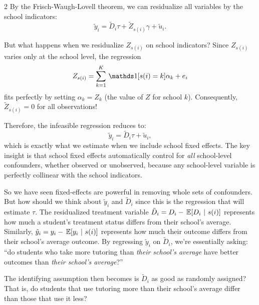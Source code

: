 \documentclass[12pt]{article}
\begin{document}
\begin{multicols}{2}
By the Frisch-Waugh-Lovell theorem, we can residualize all variables by the school indicators:
$$
  \tilde{y}_i = \tilde{D}_i \tau + \tilde{Z}_{s(i)} \gamma + \tilde{u}_i.
$$

But what happens when we residualize $Z_{s(i)}$ on school indicators? 
Since $Z_{s(i)}$ varies only at the school level, the regression
$$
  Z_{s(i)} = \sum_{k=1}^K \one{s(i)=k}\alpha_k + e_i
$$
fits perfectly by setting $\alpha_k = Z_k$ (the value of $Z$ for school $k$). Consequently, $\tilde{Z}_{s(i)} = 0$ for all observations!

Therefore, the infeasible regression reduces to:
$$
  \tilde{y}_i = \tilde{D}_i \tau + \tilde{u}_i,
$$
which is exactly what we estimate when we include school fixed effects. 
The key insight is that school fixed effects automatically control for \emph{all} school-level confounders, whether observed or unobserved, because any school-level variable is perfectly collinear with the school indicators.

So we have seen fixed-effects are powerful in removing whole sets of confounders. 
But how should we think about $\tilde{y}_i$ and $\tilde{D}_i$ since this is the regression that will estimate $\tau$.
The residualized treatment variable $\tilde{D}_i = D_i - \expec{D_i}{s(i)}$ represents how much a student's treatment status differs from their school's average. 
Similarly, $\tilde{y}_i = y_i - \expec{y_i}{s(i)}$ represents how much their outcome differs from their school's average outcome. 
By regressing $\tilde{y}_i$ on $\tilde{D}_i$, we're essentially asking: ``do students who take more tutoring than \emph{their school's average} have better outcomes than \emph{their school's average}?''

The identifying assumption then becomes is $\tilde{D}_i$ as good as randomly assigned? 
That is, do students that use tutoring more than their school's average differ than those that use it less? 



\end{multicols}
\end{document}
